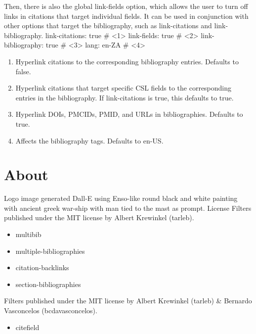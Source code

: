 \documentclass[
  12pt,
  a4paper,
  oneside,
  titlepage,
  toclink=all,
  toc=bibliography]{scrbook}
\providecommand{\tightlist}{%
  \setlength{\itemsep}{0pt}\setlength{\parskip}{0pt}}\usepackage{longtable,booktabs,array}
\theoremstyle{definition}
\theoremstyle{plain}
\theoremstyle{plain}
\theoremstyle{plain}
\theoremstyle{plain}
\theoremstyle{definition}
\theoremstyle{definition}
\theoremstyle{plain}
\theoremstyle{remark}
\begin{document}
Then, there is also the global link-fields option, which allows the user
to turn off links in citations that target individual fields. It can be
used in conjunction with other options that target the bibliography,
such as link-citations and link-bibliography. link-citations: true \#
\textless1\textgreater{} link-fields: true \# \textless2\textgreater{}
link-bibliography: true \# \textless3\textgreater{} lang: en-ZA \#
\textless4\textgreater{}

\begin{enumerate}
\def\labelenumi{\arabic{enumi}.}
\tightlist
\item
  Hyperlink citations to the corresponding bibliography entries.
  Defaults to false.
\item
  Hyperlink citations that target specific CSL fields to the
  corresponding entries in the bibliography. If link-citations is true,
  this defaults to true.
\item
  Hyperlink DOIs, PMCIDs, PMID, and URLs in bibliographies. Defaults to
  true.
\item
  Affects the bibliography tags. Defaults to en-US.
\end{enumerate}

\hypertarget{sec-scriv53}{%
\section{About}\label{sec-scriv53}}

\protect\hypertarget{scriv53}{}{}

Logo image generated Dall-E using Enso-like round black and white
painting with ancient greek war-ship with man tied to the mast as
prompt. License Filters published under the MIT license by Albert
Krewinkel (tarleb).

\begin{itemize}
\tightlist
\item
  multibib
\item
  multiple-bibliographies
\item
  citation-backlinks
\item
  section-bibliographies
\end{itemize}

Filters published under the MIT license by Albert Krewinkel (tarleb) \&
Bernardo Vasconcelos (bcdavasconcelos).

\begin{itemize}
\tightlist
\item
  citefield
\end{itemize}
\end{document}
